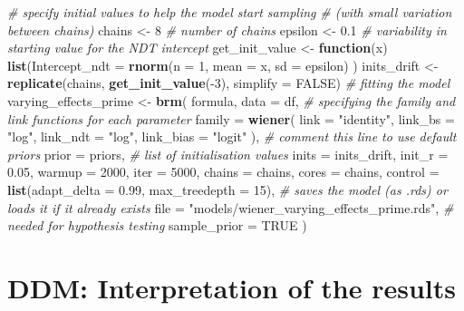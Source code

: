 \documentclass[
  11pt,
  english,
  ,doc,floatsintext]{apa6}
\newenvironment{Shaded}{}{}
\newcommand{\CommentTok}[1]{\textcolor[rgb]{0.38,0.63,0.69}{\textit{#1}}}
\newcommand{\ControlFlowTok}[1]{\textcolor[rgb]{0.00,0.44,0.13}{\textbf{#1}}}
\newcommand{\DataTypeTok}[1]{\textcolor[rgb]{0.56,0.13,0.00}{#1}}
\newcommand{\DecValTok}[1]{\textcolor[rgb]{0.25,0.63,0.44}{#1}}
\newcommand{\FloatTok}[1]{\textcolor[rgb]{0.25,0.63,0.44}{#1}}
\newcommand{\KeywordTok}[1]{\textcolor[rgb]{0.00,0.44,0.13}{\textbf{#1}}}
\newcommand{\NormalTok}[1]{#1}
\newcommand{\OperatorTok}[1]{\textcolor[rgb]{0.40,0.40,0.40}{#1}}
\newcommand{\OtherTok}[1]{\textcolor[rgb]{0.00,0.44,0.13}{#1}}
\newcommand{\StringTok}[1]{\textcolor[rgb]{0.25,0.44,0.63}{#1}}
\begin{document}
\begin{Shaded}
\begin{Highlighting}[]
\CommentTok{# specify initial values to help the model start sampling}
\CommentTok{# (with small variation between chains)}
\NormalTok{chains <-}\StringTok{ }\DecValTok{8} \CommentTok{# number of chains}
\NormalTok{epsilon <-}\StringTok{ }\FloatTok{0.1} \CommentTok{# variability in starting value for the NDT intercept}
\NormalTok{get_init_value <-}\StringTok{ }\ControlFlowTok{function}\NormalTok{(x) }\KeywordTok{list}\NormalTok{(}\DataTypeTok{Intercept_ndt =} \KeywordTok{rnorm}\NormalTok{(}\DataTypeTok{n =} \DecValTok{1}\NormalTok{, }\DataTypeTok{mean =}\NormalTok{ x, }\DataTypeTok{sd =}\NormalTok{ epsilon) )}
\NormalTok{inits_drift <-}\StringTok{ }\KeywordTok{replicate}\NormalTok{(chains, }\KeywordTok{get_init_value}\NormalTok{(}\OperatorTok{-}\DecValTok{3}\NormalTok{), }\DataTypeTok{simplify =} \OtherTok{FALSE}\NormalTok{)}
\CommentTok{# fitting the model}
\NormalTok{varying_effects_prime <-}\StringTok{ }\KeywordTok{brm}\NormalTok{(}
\NormalTok{  formula, }
  \DataTypeTok{data =}\NormalTok{ df,}
  \CommentTok{# specifying the family and link functions for each parameter}
  \DataTypeTok{family =} \KeywordTok{wiener}\NormalTok{(}
    \DataTypeTok{link =} \StringTok{"identity"}\NormalTok{, }\DataTypeTok{link_bs =} \StringTok{"log"}\NormalTok{,}
    \DataTypeTok{link_ndt =} \StringTok{"log"}\NormalTok{, }\DataTypeTok{link_bias =} \StringTok{"logit"}
\NormalTok{    ),}
  \CommentTok{# comment this line to use default priors}
  \DataTypeTok{prior =}\NormalTok{ priors,}
  \CommentTok{# list of initialisation values}
  \DataTypeTok{inits =}\NormalTok{ inits_drift,}
  \DataTypeTok{init_r =} \FloatTok{0.05}\NormalTok{,}
  \DataTypeTok{warmup =} \DecValTok{2000}\NormalTok{, }\DataTypeTok{iter =} \DecValTok{5000}\NormalTok{,}
  \DataTypeTok{chains =}\NormalTok{ chains, }\DataTypeTok{cores =}\NormalTok{ chains,}
  \DataTypeTok{control =} \KeywordTok{list}\NormalTok{(}\DataTypeTok{adapt_delta =} \FloatTok{0.99}\NormalTok{, }\DataTypeTok{max_treedepth =} \DecValTok{15}\NormalTok{),}
  \CommentTok{# saves the model (as .rds) or loads it if it already exists}
  \DataTypeTok{file =} \StringTok{"models/wiener_varying_effects_prime.rds"}\NormalTok{,}
  \CommentTok{# needed for hypothesis testing}
  \DataTypeTok{sample_prior =} \OtherTok{TRUE}
\NormalTok{  )}
\end{Highlighting}
\end{Shaded}

\hypertarget{ddm-interpretation-of-the-results}{%
\section{DDM: Interpretation of the results}\label{ddm-interpretation-of-the-results}}
\end{document}
